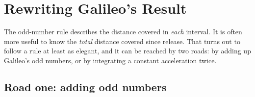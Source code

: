 \documentclass[11pt,twoside,openany]{book}
\begin{document}
\section{Rewriting Galileo's Result}
\label{sec:rewriting}

The odd-number rule describes the distance covered in \emph{each} interval. It is often more useful to know the \emph{total} distance covered since release. That turns out to follow a rule at least as elegant, and it can be reached by two roads: by adding up Galileo's odd numbers, or by integrating a constant acceleration twice.

\subsection{Road one: adding odd numbers}
\end{document}

